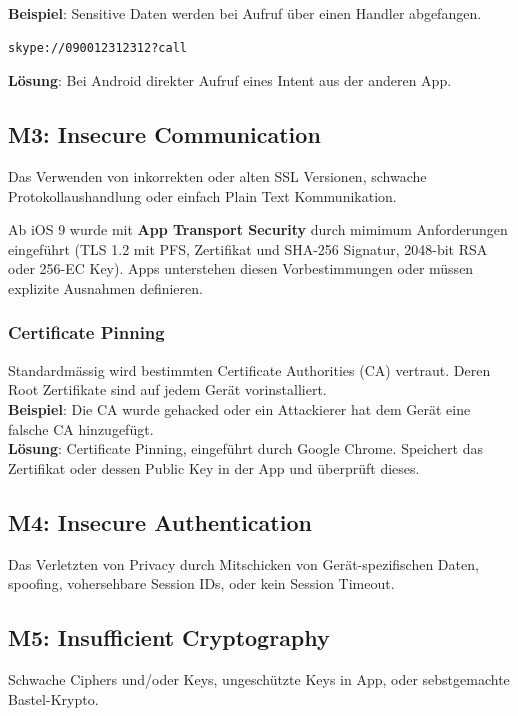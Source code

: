 \textbf{Beispiel}: Sensitive Daten werden bei Aufruf über einen Handler abgefangen.
\begin{lstlisting}[language=XML, caption=Aufruf von Skype]
skype://090012312312?call
\end{lstlisting}

\textbf{Lösung}: Bei Android direkter Aufruf eines Intent aus der anderen App.

\subsection{M3: Insecure Communication}
Das Verwenden von inkorrekten oder alten SSL Versionen, schwache Protokollaushandlung oder einfach Plain Text Kommunikation.

Ab iOS 9 wurde mit \textbf{App Transport Security} durch mimimum Anforderungen eingeführt (TLS 1.2 mit PFS, Zertifikat und SHA-256 Signatur, 2048-bit RSA oder 256-EC Key). Apps unterstehen diesen Vorbestimmungen oder müssen explizite Ausnahmen definieren.

\subsubsection{Certificate Pinning}
Standardmässig wird bestimmten Certificate Authorities (CA) vertraut. Deren Root Zertifikate sind auf jedem Gerät vorinstalliert.\\

\textbf{Beispiel}: Die CA wurde gehacked oder ein Attackierer hat dem Gerät eine falsche CA hinzugefügt. \\

\textbf{Lösung}: Certificate Pinning, eingeführt durch Google Chrome. Speichert das Zertifikat oder dessen Public Key in der App und überprüft dieses.

\subsection{M4: Insecure Authentication}
Das Verletzten von Privacy durch Mitschicken von Gerät-spezifischen Daten, spoofing, vohersehbare Session IDs, oder kein Session Timeout.

\subsection{M5: Insufficient Cryptography}
Schwache Ciphers und/oder Keys, ungeschützte Keys in App, oder sebstgemachte Bastel-Krypto.\\


